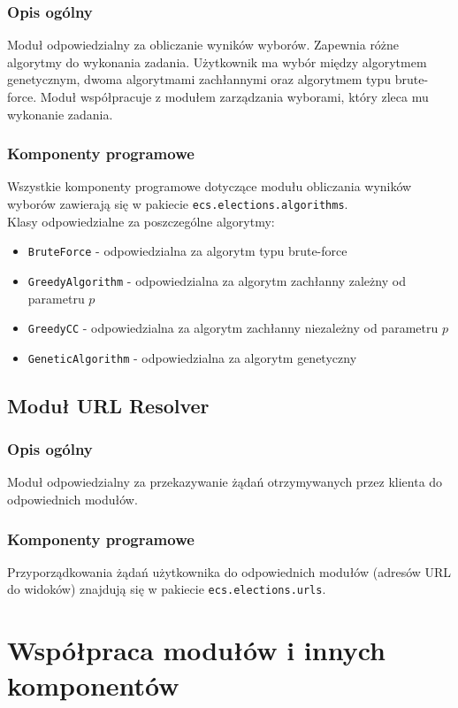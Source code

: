 \documentclass[pdflatex,11pt]{../aghdoc_version2}
\newcommand{\code}[1]{\texttt{#1}}
\begin{document}
\subsection{Opis ogólny}
Moduł odpowiedzialny za obliczanie wyników wyborów. Zapewnia różne algorytmy do
wykonania zadania. Użytkownik ma wybór między algorytmem genetycznym, dwoma
algorytmami zachłannymi oraz algorytmem typu brute-force. Moduł współpracuje z modułem
zarządzania wyborami, który zleca mu wykonanie zadania.
\subsection{Komponenty programowe}
Wszystkie komponenty programowe dotyczące modułu obliczania wyników wyborów
zawierają się w pakiecie \code{ecs.elections.algorithms}. \\
Klasy odpowiedzialne za poszczególne algorytmy:
\begin{itemize}
\item \code{BruteForce} - odpowiedzialna za algorytm typu brute-force
\item \code{GreedyAlgorithm} - odpowiedzialna za algorytm zachłanny zależny od parametru $p$
\item \code{GreedyCC} - odpowiedzialna za algorytm zachłanny niezależny od parametru $p$
\item \code{GeneticAlgorithm} - odpowiedzialna za algorytm genetyczny
\end{itemize}

\section{Moduł URL Resolver}
\subsection{Opis ogólny}
Moduł odpowiedzialny za przekazywanie żądań otrzymywanych przez klienta do
odpowiednich modułów.

\subsection{Komponenty programowe}
Przyporządkowania żądań użytkownika do odpowiednich modułów (adresów URL do
widoków) znajdują się w pakiecie \code{ecs.elections.urls}.

\chapter{Współpraca modułów i innych komponentów}
\end{document}
